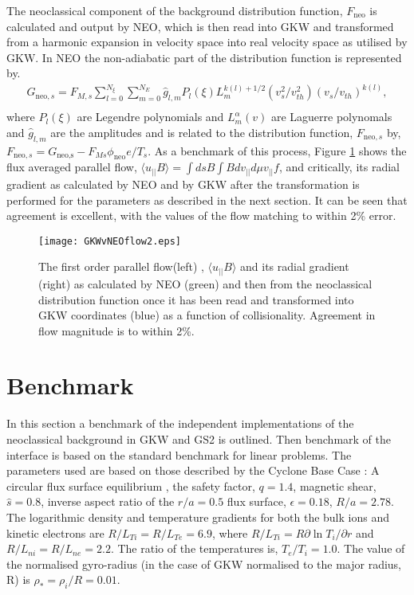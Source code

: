 The neoclassical component of the background distribution function, $F_{\mbox{neo}}$ is calculated and output by {\small NEO}, which is then read into GKW and transformed from a harmonic expansion in velocity space into real velocity space as utilised by GKW.  In {\small NEO} the non-adiabatic part of the distribution function is represented by.
\begin{eqnarray}
G_{\mbox{neo},s} = F_{M,s}\sum_{l=0}^{N_\xi}\sum_{m=0}^{N_{E}}\hat{g}_{l,m}P_{l}(\xi)L^{k(l)+1/2}_{m}(v_{s}^{2}/v_{th}^{2})(v_{s}/v_{th})^{k(l)},\nonumber\\
\end{eqnarray}
where $P_{l}(\xi)$ are Legendre polynomials and $L_{m}^{\alpha}(v)$ are Laguerre polynomals and $\hat{g}_{l,m}$ are the amplitudes and is related to the distribution function, $F_{\mbox{neo},s}$ by, $F_{\mbox{neo},s}=G_{\mbox{neo,s}}-F_{Ms}\phi_{\mbox{neo}}e/T_{s}$.  As a benchmark of this process, Figure \ref{neo:flows} shows the flux averaged parallel flow, $\langle u_{||}B\rangle = \int ds B\int B dv_{||}d\mu v_{||}f$, and critically, its radial gradient as calculated by NEO and by GKW after the transformation is performed for the parameters as described in the next section.  It can be seen that agreement is excellent, with the values of the flow matching to within 2\% error. 
\begin{figure}
\begin{centering}
\texttt{[image: GKWvNEOflow2.eps]}
\caption{The first order parallel flow(left) , $\langle u_{||}B\rangle$ and its radial gradient (right) as calculated by NEO (green) and then from the neoclassical distribution function once it has been read and transformed into GKW coordinates (blue) as a function of collisionality.  Agreement in flow magnitude is to within 2\%. }
\label{neo:flows}
\end{centering}
\end{figure}

\section{Benchmark}

In this section a benchmark of the independent implementations of the neoclassical background in GKW and GS2 \cite{DOR00} is outlined.  Then benchmark of the interface is based on the standard benchmark for linear problems.  The parameters used are based on those described by the Cyclone Base Case \cite{Cyclone}: A circular flux surface equilibrium \cite{Lapillonne}, the safety factor, $q=1.4$, magnetic shear, $\hat{s}=0.8$, inverse aspect ratio of the $r/a=0.5$ flux surface, $\epsilon = 0.18$, $R/a = 2.78$.  The logarithmic density and temperature gradients for both the bulk ions and kinetic electrons are $R/L_{Ti} = R/L_{Te} = 6.9$, where $R/L_{Ti} = R\partial \ln{T_{i}}/\partial r$ and $R/L_{ni} = R/L_{ne} = 2.2$. The ratio of the temperatures is, $T_{e}/T_{i}=1.0$.  The value of the normalised gyro-radius (in the case of GKW normalised to the major radius, R) is $\rho_{*}=\rho_{i}/R = 0.01$.


